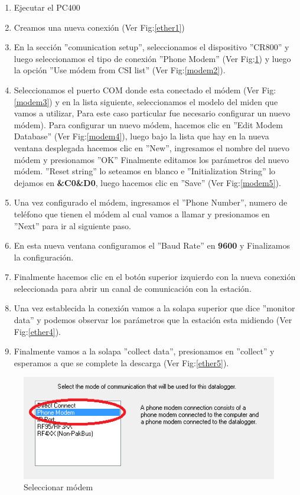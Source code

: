 \begin{enumerate}
\item Ejecutar el PC400
\item Creamos una nueva conexión (Ver Fig:\ref{ether1})
\item En la sección ''comunication setup'', seleccionamos el dispositivo ''CR800'' y luego seleccionamos el tipo de conexión ''Phone Modem'' (Ver Fig:\ref{modem1}) y luego la opción ''Use módem from CSI list'' (Ver Fig:\ref{modem2}).
\item Seleccionamos el puerto COM donde esta conectado el módem (Ver Fig:\ref{modem3}) y en la lista siguiente, seleccionamos el modelo del miden que vamos a utilizar, Para este caso particular fue necesario configurar un nuevo módem).
\subitem Para configurar un nuevo módem, hacemos clic en ''Edit Modem Database'' (Ver Fig:\ref{modem4}), luego bajo la lista que hay en la nueva ventana desplegada hacemos clic en ''New'', ingresamos el nombre del nuevo módem y presionamos ''OK''
\subitem Finalmente editamos los parámetros del nuevo módem. ''Reset string'' lo seteamos en blanco e ''Initialization String'' lo dejamos en \textbf{\&C0\&D0}, luego hacemos clic en ''Save'' (Ver Fig:\ref{modem5}). 
\item Una vez configurado el módem, ingresamos el ''Phone Number'', numero de teléfono que tienen el módem al cual vamos a llamar y presionamos en ''Next'' para ir al siguiente paso.
\item En esta nueva ventana configuramos el ''Baud Rate'' en \textbf{9600} y Finalizamos la configuración.
\item Finalmente hacemos clic en el botón superior izquierdo con la nueva conexión seleccionada para abrir un canal de comunicación con la estación.
\item Una vez establecida la conexión vamos a la solapa superior que dice ''monitor data'' y podemos observar los parámetros que la estación esta midiendo (Ver Fig:\ref{ether4}).
\item Finalmente vamos a la solapa ''collect data'', presionamos en ''collect'' y esperamos a que se complete la descarga (Ver Fig:\ref{ether5}).
\end{enumerate}
\begin{figure}[h!]
        \centering
        \includegraphics[width=320pt]{images/modem1}
        \caption{Seleccionar módem}
        \label{modem1}
\end{figure}
